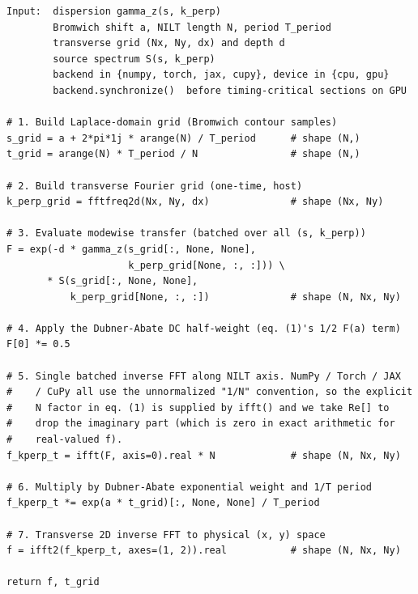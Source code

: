 \documentclass[manuscript,review]{acmart}
\begin{document}
\begin{algorithm}
\caption{\texttt{scalpel.nilt.batched\_forward} --- batched FFT-NILT
primitive. The pseudocode tracks the NumPy convention for
\texttt{ifft}; the NumPy IFFT divides by $N$ internally, so the
explicit $N$ factor in \cref{eq:dubner} cancels and only the
$\tfrac{1}{2}F(a)$ DC correction is applied separately. PyTorch and
JAX backends use the same convention; CuPy follows NumPy. Output is
in the physical $(x, y)$ space after the trailing 2D IFFT (line 7).}\label{alg:fft-nilt}
\begin{lstlisting}[style=pythonstyle,frame=none]
Input:  dispersion gamma_z(s, k_perp)
        Bromwich shift a, NILT length N, period T_period
        transverse grid (Nx, Ny, dx) and depth d
        source spectrum S(s, k_perp)
        backend in {numpy, torch, jax, cupy}, device in {cpu, gpu}
        backend.synchronize()  before timing-critical sections on GPU

# 1. Build Laplace-domain grid (Bromwich contour samples)
s_grid = a + 2*pi*1j * arange(N) / T_period      # shape (N,)
t_grid = arange(N) * T_period / N                # shape (N,)

# 2. Build transverse Fourier grid (one-time, host)
k_perp_grid = fftfreq2d(Nx, Ny, dx)              # shape (Nx, Ny)

# 3. Evaluate modewise transfer (batched over all (s, k_perp))
F = exp(-d * gamma_z(s_grid[:, None, None],
                     k_perp_grid[None, :, :])) \
       * S(s_grid[:, None, None],
           k_perp_grid[None, :, :])              # shape (N, Nx, Ny)

# 4. Apply the Dubner-Abate DC half-weight (eq. (1)'s 1/2 F(a) term)
F[0] *= 0.5

# 5. Single batched inverse FFT along NILT axis. NumPy / Torch / JAX
#    / CuPy all use the unnormalized "1/N" convention, so the explicit
#    N factor in eq. (1) is supplied by ifft() and we take Re[] to
#    drop the imaginary part (which is zero in exact arithmetic for
#    real-valued f).
f_kperp_t = ifft(F, axis=0).real * N             # shape (N, Nx, Ny)

# 6. Multiply by Dubner-Abate exponential weight and 1/T period
f_kperp_t *= exp(a * t_grid)[:, None, None] / T_period

# 7. Transverse 2D inverse FFT to physical (x, y) space
f = ifft2(f_kperp_t, axes=(1, 2)).real           # shape (N, Nx, Ny)

return f, t_grid
\end{lstlisting}
\end{algorithm}
\end{document}

